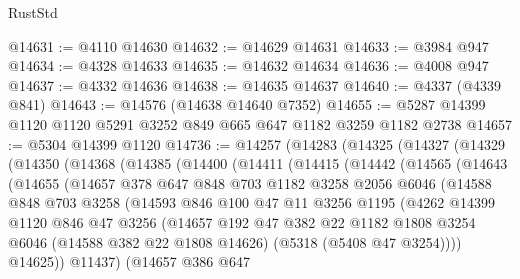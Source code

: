 \begin{lexlean}{RustStd}
\begin{coremodule}
@14631 := @4110 @14630
@14632 := @14629 @14631
@14633 := @3984 @947
@14634 := @4328 @14633
@14635 := @14632 @14634
@14636 := @4008 @947
@14637 := @4332 @14636
@14638 := @14635 @14637
@14640 := @4337 (@4339 @841)
@14643 := @14576 (@14638 @14640 @7352)
@14655 := @5287 @14399 @1120 @1120 @5291 @3252 @849 @665 @647 @1182 @3259 @1182 @2738
@14657 := @5304 @14399 @1120
@14736 := @14257
    (@14283
      (@14325
        (@14327
          (@14329
            (@14350
              (@14368
                (@14385
                  (@14400
                    (@14411
                      (@14415
                        (@14442
                          (@14565
                            (@14643
                              (@14655
                                (@14657
                                  @378
                                  @647
                                  @848
                                  @703
                                  @1182
                                  @3258
                                  @2056
                                  @6046
                                  (@14588
                                    @848
                                    @703
                                    @3258
                                    (@14593
                                      @846
                                      @100
                                      @47
                                      @11
                                      @3256
                                      @1195
                                      (@4262
                                        @14399
                                        @1120
                                        @846
                                        @47
                                        @3256
                                        (@14657
                                          @192
                                          @47
                                          @382
                                          @22
                                          @1182
                                          @1808
                                          @3254
                                          @6046
                                          (@14588 @382 @22 @1808 @14626)
                                          (@5318 (@5408 @47 @3254))))
                                      @14625))
                                  @11437)
                                (@14657
                                  @386
                                  @647

\end{coremodule}
\end{lexlean}
